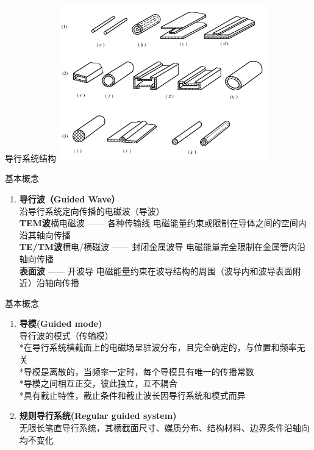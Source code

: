 \begin{frame}{导行系统结构}
  \centering
  \includegraphics[width=9cm]{Cha1//guidesystem.png}
\end{frame}

\begin{frame}{基本概念}
  \begin{enumerate}
    \resume
    \item \textbf{导行波（Guided Wave）}
          \\沿导行系统定向传播的电磁波（导波）
          \\\textbf{TEM波}\quad 横电磁波 —— 各种传输线 电磁能量约束或限制在导体之间的空间内沿其轴向传播
          \\\textbf{TE/TM波}\quad 横电/横磁波 —— 封闭金属波导 电磁能量完全限制在金属管内沿轴向传播
          \\\textbf{表面波} —— 开波导 电磁能量约束在波导结构的周围（波导内和波导表面附近）沿轴向传播
          \saveenum
  \end{enumerate}
\end{frame}

\begin{frame}{基本概念}
  \begin{enumerate}
    \resume
    \item \textbf{导模(Guided mode)}
          \\导行波的模式（传输模）
          \\ *在导行系统横截面上的电磁场呈驻波分布，且完全确定的，与位置和频率无关
          \\ *导模是离散的，当频率一定时，每个导模具有唯一的传播常数
          \\ *导模之间相互正交，彼此独立，互不耦合
          \\ *具有截止特性，截止条件和截止波长因导行系统和模式而异
    \item \textbf{规则导行系统(Regular guided system)}
          \\无限长笔直导行系统，其横截面尺寸、媒质分布、结构材料、边界条件沿轴向均不变化
  \end{enumerate}
\end{frame}

